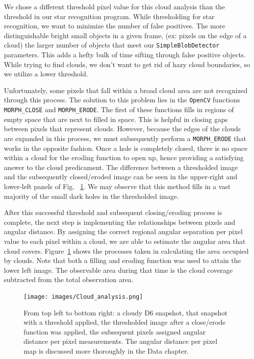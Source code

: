 We chose a different threshold pixel value for this cloud analysis than the threshold in our star recognition program.
While thresholding for star recognition, we want to minimize the number of false positives.
The more distinguishable bright small objects in a given frame, (ex: pixels on the edge of a cloud) the larger number of objects that meet our \texttt{SimpleBlobDetector} parameters.
This adds a hefty bulk of time sifting through false positive objects.
While trying to find clouds, we don't want to get rid of hazy cloud boundaries, so we utilize a lower threshold.

Unfortunately, some pixels that fall within a broad cloud area are not recognized through this process.
The solution to this problem lies in the \texttt{OpenCV} functions \texttt{MORPH\_CLOSE} and \texttt{MORPH\_ERODE}.
The first of these functions fills in regions of empty space that are next to filled in space.
This is helpful in closing gaps between pixels that represent clouds.
However, because the edges of the clouds are expanded in this process, we must subsequently perform a \texttt{MORPH\_ERODE} that works in the opposite fashion.
Once a hole is completely closed, there is no space within a cloud for the eroding function to open up, hence providing a satisfying answer to the cloud predicament. 
The difference between a thresholded image and the subsequently closed/eroded image can be seen in the upper-right and lower-left panels of Fig. ~\ref{colorclouds}.
We may observe that this method fills in a vast majority of the small dark holes in the thresholded image.

After this successful threshold and subsequent closing/eroding process is complete, the next step is implementing the relationships between pixels and angular distance.
By assigning the correct regional angular separation per pixel value to each pixel within a cloud, we are able to estimate the angular area that cloud covers.
Figure~\ref{colorclouds} shows the processes taken in calculating the area occupied by clouds.
Note that both a filling and eroding function was used to attain the lower left image.
The observable area during that time is the cloud coverage subtracted from the total observation area.


\begin{figure}[ht!]
  \centering
  \texttt{[image: images/Cloud\_analysis.png]}
  \caption[Calculating cloud area coverage from thresholding and applying our angular distance per pixel map.]{From top left to bottom right: a cloudy D6 snapshot, that snapshot with a threshold applied, the thresholded image after a close/erode function was applied, the subsequent pixels assigned angular distance per pixel measurements.  The angular distance per pixel map is discussed more thoroughly in the Data chapter.}
  \label{colorclouds}
\end{figure}


